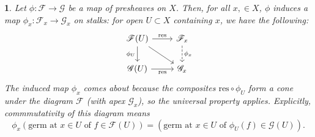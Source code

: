 \documentclass[12pt]{article}
\newtheorem{para}[theorem]{}
\begin{document}
\begin{para}
	Let $\phi:\mathscr{F}\to\mathscr{G}$ be a map of presheaves on $X$. Then, for all $x,\in X$, $\phi$ induces a map $\phi_x:\mathscr{F}_x\to\mathscr{G}_x$ on stalks: for open $U\subset X$ containing $x$, we have the following:
	\begin{equation*}
\begin{tikzcd}
\mathscr{F}(U) \arrow[r, "\text{res}"] \arrow[d, "\phi_U"'] \arrow[rd] & \mathscr{F}_x \arrow[d, "\phi_x", dashed] \\
\mathscr{G}(U) \arrow[r, "\text{res}"']                                & \mathscr{G}_x                            
\end{tikzcd}
	\end{equation*}
	The induced map $\phi_x$ comes about because the composites $\text{res}\circ\phi_U$ form a cone under the diagram $\mathscr{F}$ (with apex $\mathscr{G}_x$), so the universal property applies. Explicitly, commmutativity of this diagram means 
	\begin{equation*}
		\phi_x(\text{germ at }x\in U\text{ of }f\in\mathscr{F}(U)) = (\text{germ at }x\in U\text{ of }\phi_U(f)\in\mathscr{G}(U)).
	\end{equation*}
\end{para}
\end{document}
